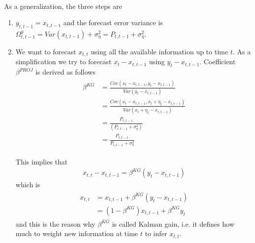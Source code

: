 \documentclass[14pt]{article}
\begin{document}
\ 

As a generalization, the three steps are
\begin{enumerate}
	\item $y_{t,t-1} = x_{t,t-1}$ and the forecast error variance is $\Omega^y_{t,t-1} = Var(x_{t,t-1}) + \sigma^2_{\eta} = P_{t,t-1} + \sigma^2_{\eta}$.
	\item We want to forecast $x_{t,t}$ using all the available information up to time $t$. As a simplification we try to forecast $x_{t} -  x_{t,t-1}$ using $y_t -  x_{t,t-1}$.
	Coefficient $\beta^{PROJ}$ is derived as follows
	\begin{eqnarray}
	\begin{aligned}
	\beta^{KG} &= \frac{Cov(x_t -  x_{t,t-1}, y_t - x_{t,t-1})}{Var(y_t -  x_{t,t-1})}  \\
	             &= \frac{Cov(x_t - x_{t,t-1},  x_t + \eta_t -  x_{t,t-1})}{Var( x_t + \eta_t - x_{t,t-1})} \\
	             &= \frac{ P_{t,t-1}}{ ( P_{t,t-1} + \sigma^2_{\eta})} \\
	             &= \frac{P_{t,t-1}}{P_{t,t-1} + \sigma^2_{\eta}} 
	\end{aligned}
	\end{eqnarray}
	
	This implies that
	\begin{eqnarray}
	x_{t,t} - x_{t,t-1} = \beta^{KG} (y_t - x_{t,t-1})
	\end{eqnarray}
	which is
		\begin{eqnarray}
			\begin{aligned}
	x_{t,t} &= x_{t,t-1} +  \beta^{KG} (y_t - x_{t,t-1}) \\
	&= (1 - \beta^{KG})  x_{t,t-1} +  \beta^{KG}  y_t
		\end{aligned}
	\end{eqnarray}
	and this is the reason why $\beta^{KG}$ is called Kalman gain, i.e. it defines how much to weight new information at time $t$ to infer $x_{t,t}$.
	

\end{enumerate}
\end{document}
